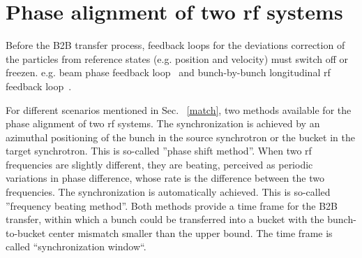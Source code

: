   
\section{Phase alignment of two rf systems}
\label{two_sync_methods}

Before the B2B transfer process, feedback loops for the deviations correction of the particles from reference states (e.g. position and velocity) must switch off or freezen. e.g. beam phase feedback loop~\cite{grieser_beam_2015} and bunch-by-bunch longitudinal rf feedback loop~\cite{gross_bunch-by-bunch_2015}. 

For different scenarios mentioned in Sec. ~\ref{match}, two methods available for the phase alignment of two rf systems. The synchronization is achieved by an azimuthal positioning of the bunch in the source synchrotron or the bucket in the target synchrotron. This is so-called ''phase shift method''. When two rf frequencies are slightly different, they are beating, perceived as periodic variations in phase difference, whose rate is the difference between the two frequencies. The synchronization is automatically achieved. This is so-called ''frequency beating method''. Both methods provide a time frame for the B2B transfer, within which a bunch could be transferred into a bucket with the bunch-to-bucket center mismatch smaller than the upper bound. The time frame is called ``synchronization window``. 

